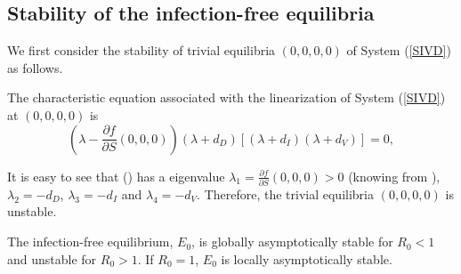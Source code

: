 \documentclass{CMHPhD-SIVD}
\begin{document}




\subsection{Stability of the infection-free equilibria}\label{sec3.2}
We first consider the stability of trivial equilibria $(0,0,0,0)$ of System (\ref{SIVD}) as follows.

The characteristic equation associated with the linearization of System (\ref{SIVD}) at $(0, 0, 0,0)$ is
\begin{equation}\label{c0}
    \left(\lambda-\frac{\partial f}{\partial S} (0, 0, 0)\right)(\lambda+d_D)\left[(\lambda+d_I)(\lambda+d_V)\right]=0,
\end{equation}

It is easy to see that () has a eigenvalue $\lambda_1=\frac{\partial f}{\partial S} (0, 0, 0)>0$ (knowing from ), $\lambda_2=-d_D$, $\lambda_3=-d_I$ and $\lambda_4=-d_V$. Therefore, the trivial equilibria $(0,0,0,0)$ is unstable.


\begin{theorem}\label{thm2}
 The infection-free equilibrium, $E_0$, is globally asymptotically stable for $R_0 < 1$ and unstable for $R_0 >1$.  If $R_0 = 1$, $E_0$ is locally asymptotically stable.
 \end{theorem}
\end{document}
